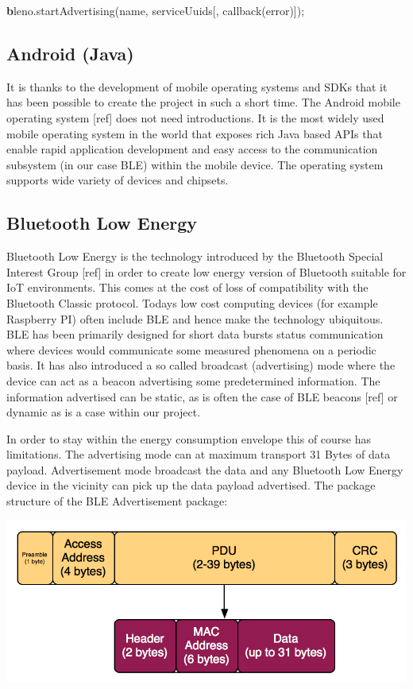 \smallskip
{\textbf bleno.startAdvertising(name, serviceUuids[, callback(error)]);}
\newline
\smallskip

\subsection{Android (Java)}
\label{subsec:android}
It is thanks to the development of mobile operating systems and SDKs that it has been possible to create the project in such a short time. The Android mobile operating system [ref] does not need introductions. It is the most widely used mobile operating system in the world that exposes rich Java based APIs that enable rapid application development and easy access to the communication subsystem (in our case BLE) within the mobile device. The operating system supports wide variety of devices and chipsets.


\subsection{Bluetooth Low Energy}
\label{subsec:bluetooth}
Bluetooth Low Energy is the technology introduced by the Bluetooth Special Interest Group [ref] in order to create low energy version of Bluetooth suitable for IoT environments. This comes at the cost of loss of compatibility with the Bluetooth Classic protocol. Todays low cost computing devices (for example Raspberry PI) often include BLE and hence make the technology ubiquitous. BLE has been primarily designed for short data bursts status communication where devices would communicate some measured phenomena on a periodic basis. It has also introduced a so called broadcast (advertising) mode where the device can act as a beacon advertising some predetermined information. The information advertised can be static, as is often the case of BLE beacons [ref] or dynamic as is a case within our project. 

\bigskip

In order to stay within the energy consumption envelope this of course has limitations. The advertising mode can at maximum transport 31 Bytes of data payload. Advertisement mode broadcast the data and any Bluetooth Low Energy device in the vicinity can pick up the data payload advertised. The package structure of the BLE Advertisement package:

\bigskip
\includegraphics[scale=0.4]{gfx/blepacket} 
\bigskip  

